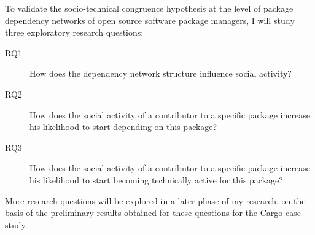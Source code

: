 To validate the socio-technical congruence hypothesis at the level of package dependency networks of open source software package managers, I will study three exploratory research questions: 
\begin{description}
\item[RQ1] How does the dependency network structure influence social activity? 
\item[RQ2] How does the social activity of a contributor to a specific package increase his likelihood to start depending on this package?
\item[RQ3] How does the social activity of a contributor to a specific package increase his likelihood to start becoming technically active for this package?
\end{description}

More research questions will be explored in a later phase of my research, on the basis of the preliminary results obtained for these questions for the Cargo case study. 